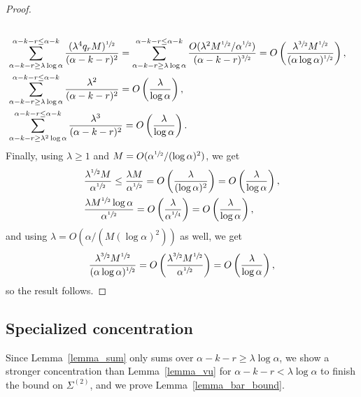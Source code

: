 \documentclass{article}
\theoremstyle{plain}
\theoremstyle{remark}
\theoremstyle{plain}
\numberwithin{equation}{section}
\begin{document}
\begin{proof}
\begin{align}
			\\&\sum_{\alpha-k-r\geq\lambda\log\alpha}^{\alpha-k-r\leq\alpha-k}\frac{(\lambda^4q_rM)^{\sfrac12}}{(\alpha-k-r)^2}=\sum_{\alpha-k-r\geq\lambda\log\alpha}^{\alpha-k-r\leq\alpha-k}\frac{O(\lambda^2M^{\sfrac12}/\alpha^{\sfrac12})}{(\alpha-k-r)^{\sfrac32}}=O\left(\frac{\lambda^{\sfrac32}M^{\sfrac12}}{(\alpha\log\alpha)^{\sfrac12}}\right),
			\\&\sum_{\alpha-k-r\geq\lambda\log\alpha}^{\alpha-k-r\leq\alpha-k}\frac{\lambda^2}{(\alpha-k-r)^2}=O\left(\frac{\lambda}{\log\alpha}\right),
			\\&\sum_{\alpha-k-r\geq\lambda^2\log\alpha}^{\alpha-k-r\leq\alpha-k}\frac{\lambda^3}{(\alpha-k-r)^2}=O\left(\frac{\lambda}{\log\alpha}\right).
		\end{align}
		Finally, using $\lambda\geq1$ and $M=O(\alpha^{\sfrac12}/(\log\alpha)^2)$, we get
		\begin{align}
			&\frac{\lambda^{\sfrac12}M}{\alpha^{\sfrac12}}\leq\frac{\lambda M}{\alpha^{\sfrac12}}=O\left(\frac{\lambda}{(\log\alpha)^2}\right)=O\left(\frac{\lambda}{\log\alpha}\right),
			\\&\frac{\lambda M^{\sfrac12}\log\alpha}{\alpha^{\sfrac12}}=O\left(\frac{\lambda}{\alpha^{\sfrac14}}\right)=O\left(\frac{\lambda}{\log\alpha}\right),
		\end{align}
		and using $\lambda=O(\alpha/(M(\log\alpha)^2))$ as well, we get
		\begin{equation}
			\frac{\lambda^{\sfrac32}M^{\sfrac12}}{(\alpha\log\alpha)^{\sfrac12}}=O\left(\frac{\lambda^{\sfrac32}M^{\sfrac12}}{\alpha^{\sfrac12}}\right)=O\left(\frac{\lambda}{\log\alpha}\right),
		\end{equation}
		so the result follows.
	\end{proof}
	
	\subsection{Specialized concentration}\label{subsection_proof_stronger}
	
	Since Lemma~\ref{lemma_sum} only sums over $\alpha-k-r\geq\lambda\log\alpha$, we show a stronger concentration than Lemma~\ref{lemma_vu} for $\alpha-k-r<\lambda\log\alpha$ to finish the bound on $\Sigma^{(2)}$, and we prove Lemma~\ref{lemma_bar_bound}.
	
\end{document}

